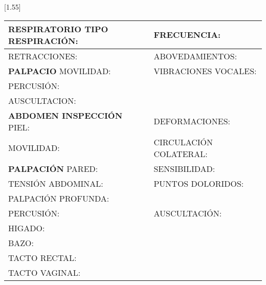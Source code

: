 \documentclass[10pt,a4paper]{article}
\begin{document}
\vspace{0.5cm}
\scalebox{1.4}[1.55]{
\begin{tabular}{|p{5.5cm} p{5.5cm} |}
\hline
\scriptsize{\textbf{RESPIRATORIO  }TIPO RESPIRACI\'ON: } & \scriptsize{FRECUENCIA: }\\
\hline
\scriptsize{RETRACCIONES: } & \scriptsize{ABOVEDAMIENTOS: } \\
\hline
\scriptsize{\textbf{PALPACIO  }MOVILIDAD: }& \scriptsize{VIBRACIONES VOCALES: }\\
\hline 
\multicolumn{2}{|l|}{\begin{minipage}[t]{12.5 cm}\scriptsize{PERCUSI\'ON: }\end{minipage}}\\
\hline
\multicolumn{2}{|l|}{\begin{minipage}[t]{12.5 cm}\scriptsize{AUSCULTACION: }\end{minipage}}\\
\hline
\scriptsize{\textbf{ABDOMEN INSPECCI\'ON  }PIEL: } & \scriptsize{DEFORMACIONES:} \\
\hline
\scriptsize{MOVILIDAD:  } & \scriptsize{CIRCULACI\'ON COLATERAL: }\\
\hline
\scriptsize{\textbf{PALPACI\'ON}  PARED: } & \scriptsize{SENSIBILIDAD: }\\
\hline
\scriptsize{TENSI\'ON ABDOMINAL:  } & \scriptsize{PUNTOS DOLORIDOS: } \\
\hline
\multicolumn{2}{|l|}{\begin{minipage}[t]{12.5 cm}\scriptsize{PALPACI\'ON PROFUNDA: }\end{minipage}}\\
\hline
\scriptsize{PERCUSI\'ON: } & \scriptsize{AUSCULTACI\'ON: } \\
\hline
\multicolumn{2}{|l|}{\begin{minipage}[t]{12.5 cm}\scriptsize{HIGADO: }\end{minipage}}\\
\hline
\multicolumn{2}{|l|}{\begin{minipage}[t]{12.5 cm}\scriptsize{BAZO: }\end{minipage}}\\
\hline
\multicolumn{2}{|l|}{\begin{minipage}[t]{12.5 cm}\scriptsize{TACTO RECTAL: }\end{minipage}}\\
\hline
\multicolumn{2}{|l|}{\begin{minipage}[t]{12.5 cm}\scriptsize{TACTO VAGINAL: }\end{minipage}}\\

\end{tabular}}
\end{document}
